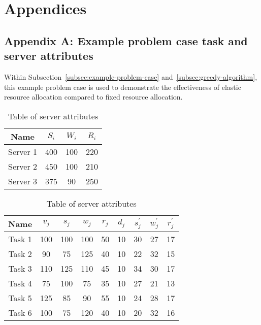 \section*{Appendices}

\subsection*{Appendix A: Example problem case task and server attributes}
Within Subsection~\ref{subsec:example-problem-case} and~\ref{subsec:greedy-algorithm}, this example problem case is used
to demonstrate the effectiveness of elastic resource allocation compared to fixed resource allocation.
\begin{table}[h]
    \begin{minipage}{1.8in}
        \begin{tabular}{|c|c|c|c|}
            \hline
            Name     & $S_i$ & $W_i$ & $R_i$ \\ \hline
            Server 1 & 400   & 100   & 220   \\ \hline
            Server 2 & 450   & 100   & 210   \\ \hline
            Server 3 & 375   & 90    & 250   \\ \hline
        \end{tabular}
        \caption{Table of server attributes}
    \end{minipage}
    \begin{minipage}{3.5in}
        \begin{tabular}{|c|c|c|c|c|c|c|c|c|}
            \hline
            Name    & $v_j$ & $s_j$ & $w_j$ & $r_j$ & $d_j$ & $s^{'}_j$ & $w^{'}_j$ & $r^{'}_j$ \\ \hline
            Task 1  & 100   & 100   & 100   & 50    & 10    & 30        & 27        & 17        \\ \hline
            Task 2  & 90    & 75    & 125   & 40    & 10    & 22        & 32        & 15        \\ \hline
            Task 3  & 110   & 125   & 110   & 45    & 10    & 34        & 30        & 17        \\ \hline
            Task 4  & 75    & 100   & 75    & 35    & 10    & 27        & 21        & 13        \\ \hline
            Task 5  & 125   & 85    & 90    & 55    & 10    & 24        & 28        & 17        \\ \hline
            Task 6  & 100   & 75    & 120   & 40    & 10    & 20        & 32        & 16        \\ \hline

\end{tabular}
\end{minipage}
\end{table}
